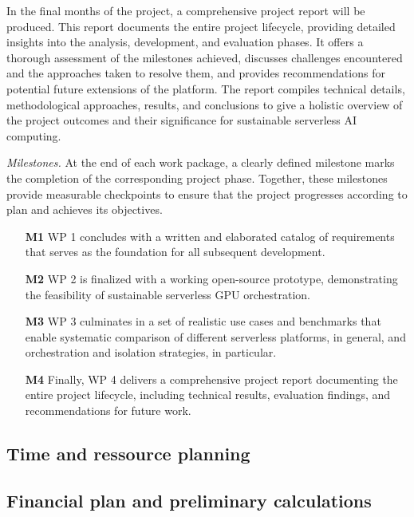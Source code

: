 In the final months of the project, a comprehensive project report will be produced.
This report documents the entire project lifecycle, providing detailed insights into the analysis, development, and evaluation phases.
It offers a thorough assessment of the milestones achieved, discusses challenges encountered and the approaches taken to resolve them, and provides recommendations for potential future extensions of the platform.
The report compiles technical details, methodological approaches, results, and conclusions to give a holistic overview of the project outcomes and their significance for sustainable serverless AI computing.

\emph{Milestones.}
At the end of each work package, a clearly defined milestone marks the completion of the corresponding project phase. 
Together, these milestones provide measurable checkpoints to ensure that the project progresses according to plan and achieves its objectives.
\begin{itemize}
    \item[\textbf{M1}] WP 1 concludes with a written and elaborated catalog of requirements that serves as the foundation for all subsequent development.
    \item[\textbf{M2}] WP 2 is finalized with a working open-source prototype, demonstrating the feasibility of sustainable serverless GPU orchestration.
    \item[\textbf{M3}] WP 3 culminates in a set of realistic use cases and benchmarks that enable systematic comparison of different serverless platforms, in general, and orchestration and isolation strategies, in particular.
    \item[\textbf{M4}] Finally, WP 4 delivers a comprehensive project report documenting the entire project lifecycle, including technical results, evaluation findings, and recommendations for future work. 
\end{itemize}

\subsection{Time and ressource planning}\label{subsec:time}

\subsection{Financial plan and preliminary calculations}\label{subsec:finances}

